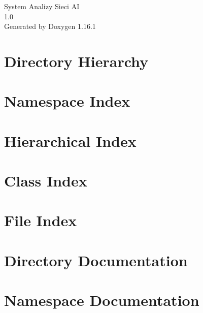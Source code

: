 \documentclass[twoside]{book}
\newcommand{\+}{\discretionary{\mbox{\scriptsize$\hookleftarrow$}}{}{}}
\newcommand{\clearemptydoublepage}{%
    \newpage{\pagestyle{empty}\cleardoublepage}%
  }
\begin{document}
  \raggedbottom
    \hypersetup{pageanchor=false,
                bookmarksnumbered=true,
                pdfencoding=unicode
               }
  \begin{titlepage}
  \vspace*{7cm}
  \begin{center}%
  {\Large System Analizy Sieci AI}\\
  [1ex]\large 1.\+0 \\
  \vspace*{1cm}
  {\large Generated by Doxygen 1.16.1}\\
  \end{center}
  \end{titlepage}
  \clearemptydoublepage
  \tableofcontents
  \clearemptydoublepage
  \hypersetup{pageanchor=true}
\chapter{Directory Hierarchy}

\chapter{Namespace Index}

\chapter{Hierarchical Index}

\chapter{Class Index}

\chapter{File Index}

\chapter{Directory Documentation}





\chapter{Namespace Documentation}

\end{document}
